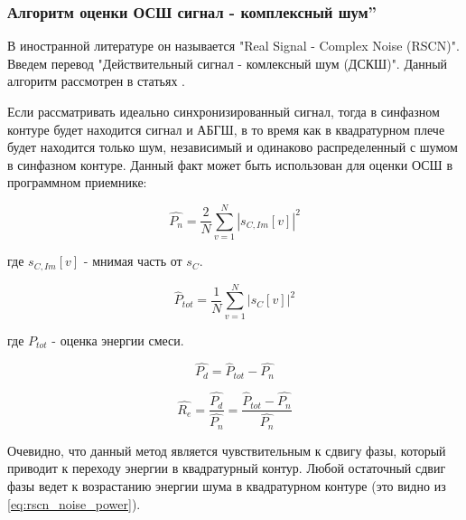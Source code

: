 \subsubsection{Алгоритм оценки ОСШ
 сигнал - комплексный шум\textquotedblright}
\label{sssec:rscn}
В иностранной литературе он называется "Real Signal - Complex Noise (RSCN)". Введем перевод
"Действительный сигнал - комлексный шум (ДСКШ)".
Данный алгоритм рассмотрен в статьях \cite{badke_rscn, presti_insidegnss, presti_ieee}.

Если рассматривать идеально синхронизированный сигнал, тогда в синфазном контуре будет
находится сигнал и АБГШ, в то время как в квадратурном плече будет находится только шум,
независимый и одинаково распределенный с шумом в синфазном контуре. Данный факт может
быть использован для оценки ОСШ в программном приемнике:
\begin{center}
\begin{equation}
	\label{eq:rscn_noise_power}
	\hat{P_n} = \frac{2}{N}\sum^N_{v=1}|s_{C,Im}[v]|^2
\end{equation}
\end{center}
где ${s_{C,Im}[v]}$ - мнимая часть от ${s_C}$.

\begin{center}
\begin{equation}
	\label{eq:rscn_total_power}
	\hat{P}_{tot} = \frac{1}{N}\sum^N_{v=1}|s_{C}[v]|^2
\end{equation}
\end{center}
где ${P_{tot}}$ - оценка энергии смеси.

\begin{center}
\begin{equation}
	\label{eq:rscn_data_power}
	\hat{P_d} = \hat{P}_{tot} - \hat{P_n}
\end{equation}
\end{center}

\begin{center}
\begin{equation}
	\label{eq:rscn_snr}
	\hat{R_e} = \frac{\hat{P_d}}{\hat{P_n}} = \frac{\hat{P}_{tot} - \hat{P_n}}{\hat{P_n}} 
\end{equation}
\end{center}

Очевидно, что данный метод является чувствительным к сдвигу фазы, который приводит к переходу энергии
в квадратурный контур. Любой остаточный сдвиг фазы ведет к возрастанию энергии шума в квадратурном
контуре (это видно из \ref{eq:rscn_noise_power}).

